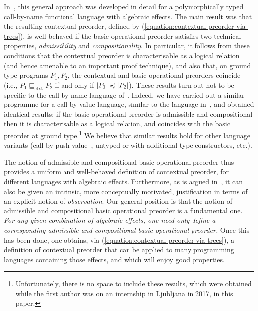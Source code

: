 In~\cite{gom}, this general approach was developed in detail for 
a polymorphically typed call-by-name functional language with algebraic effects. 
The main result was that the resulting contextual preorder, defined by (\ref{equation:contextual-preorder-via-trees}), is well behaved if the basic operational preorder satisfies two technical properties, \emph{admissibility} and \emph{compositionality}. In particular, it follows from these conditions that 
the contextual preorder is characterisable as a {logical relation} (and hence amenable to an important proof technique), and also that, on ground type programs $P_1,P_2$,
the contextual and basic operational preorders coincide (i.e., $P_1 \sqsubseteq_\text{ctxt} P_2$ if and only if
$|P_1| \preccurlyeq |P_2|$). These results turn out not to be specific to the call-by-name language of~\cite{gom}.
Indeed, we have carried out a similar programme for a call-by-value language,
similar to the language in~\cite{plotkin2001adequacy}, and obtained identical results: if the basic operational preorder is admissible and compositional then it is characterisable as a logical relation, 
and coincides with the basic preorder at ground type.\footnote{Unfortunately, there is no space to include these results, which were obtained while the first author was on an internship in Ljubljana in 2017, in this paper.}
We believe that similar results hold for other language variants (call-by-push-value~\cite{LevyCBPV}, untyped or with additional type constructors, etc.). %



The
notion of admissible and  compositional basic operational preorder thus provides a uniform and well-behaved definition of contextual preorder, for different languages with algebraic effects. Furthermore,
as is argued in~\cite[\S{V}]{gom}, it can also be given an intrinsic, more conceptually motivated, justification in terms of an explicit  notion of \emph{observation}. 
Our general position is that the notion of admissible and  compositional basic operational preorder is a fundamental one. 
\emph{For any given combination of algebraic effects, one need only define a corresponding admissible and compositional basic operational preorder.} Once this has been done,  one obtains, via (\ref{equation:contextual-preorder-via-trees}), a definition of contextual preorder that can be applied to many programming languages containing those effects, and which will enjoy good properties.

